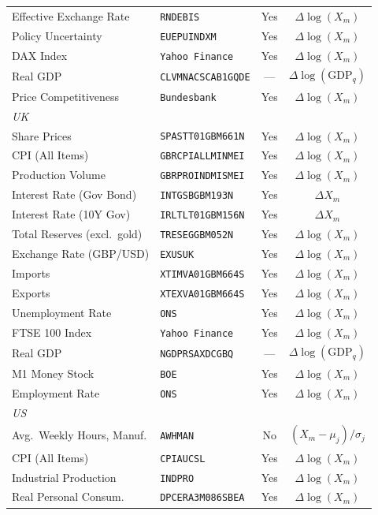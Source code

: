 \begin{longtable}{llcc}
Effective Exchange Rate & \texttt{RNDEBIS} & Yes & $\Delta\log(X_m)$ \\
Policy Uncertainty & \texttt{EUEPUINDXM} & Yes & $\Delta\log(X_m)$ \\
DAX Index & \texttt{Yahoo Finance} & Yes & $\Delta\log(X_m)$ \\
Real GDP & \texttt{CLVMNACSCAB1GQDE} & --- & $\Delta\log(\text{GDP}_q)$ \\
Price Competitiveness & \texttt{Bundesbank} & Yes & $\Delta\log(X_m)$ \\
\addlinespace
\textit{UK} & & & \\
Share Prices & \texttt{SPASTT01GBM661N} & Yes & $\Delta\log(X_m)$ \\
CPI (All Items) & \texttt{GBRCPIALLMINMEI} & Yes & $\Delta\log(X_m)$ \\
Production Volume & \texttt{GBRPROINDMISMEI} & Yes & $\Delta\log(X_m)$ \\
Interest Rate (Gov Bond) & \texttt{INTGSBGBM193N} & Yes & $\Delta X_m$ \\
Interest Rate (10Y Gov) & \texttt{IRLTLT01GBM156N} & Yes & $\Delta X_m$ \\
Total Reserves (excl.\ gold) & \texttt{TRESEGGBM052N} & Yes & $\Delta\log(X_m)$ \\
Exchange Rate (GBP/USD) & \texttt{EXUSUK} & Yes & $\Delta\log(X_m)$ \\
Imports & \texttt{XTIMVA01GBM664S} & Yes & $\Delta\log(X_m)$ \\
Exports & \texttt{XTEXVA01GBM664S} & Yes & $\Delta\log(X_m)$ \\
Unemployment Rate & \texttt{ONS} & Yes & $\Delta\log(X_m)$ \\
FTSE 100 Index & \texttt{Yahoo Finance} & Yes & $\Delta\log(X_m)$ \\
Real GDP & \texttt{NGDPRSAXDCGBQ} & --- & $\Delta\log(\text{GDP}_q)$ \\
M1 Money Stock & \texttt{BOE} & Yes & $\Delta\log(X_m)$ \\
Employment Rate & \texttt{ONS} & Yes & $\Delta\log(X_m)$ \\
\addlinespace
\textit{US} & & & \\
Avg.\ Weekly Hours, Manuf. & \texttt{AWHMAN} & No & $(X_m - \mu_j)/\sigma_j$ \\
CPI (All Items) & \texttt{CPIAUCSL} & Yes & $\Delta\log(X_m)$ \\
Industrial Production & \texttt{INDPRO} & Yes & $\Delta\log(X_m)$ \\
Real Personal Consum. & \texttt{DPCERA3M086SBEA} & Yes & $\Delta\log(X_m)$ \\

\end{longtable}
